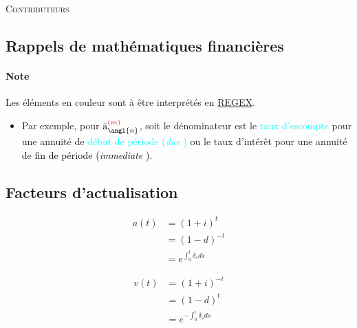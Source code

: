 \documentclass[10pt, french]{article}
\newcommand\cumlaut[2][black]{\stackon[.33ex]{#2}{\textcolor{#1}{\kern-.04ex.\kern-.2ex.}}}
\begin{document}
\begin{center}
	\textsc{\Large Contributeurs}\\[0.5cm] 
\end{center}


\newpage

\raggedcolumns
\footnotesize %
\begin{multicols*}{3} 	%
\section*{Rappels de mathématiques financières}
\paragraph{Note}	Les éléments en couleur sont à être interprétés en \href{https://fr.wikipedia.org/wiki/Expression_régulière}{REGEX}. 
\begin{itemize}
	\item	Par exemple, pour $\cumlaut[cyan]{a}_{\angl{n}}^{\textcolor{red}{(m)}}$, soit le dénominateur est le \textcolor{cyan}{taux d'escompte} pour une annuité de \textcolor{cyan}{début de période (\og \textit{due} \fg{})} ou le taux d'intérêt pour une annuité de \textcolor{black}{fin de période (\og \textit{immediate} \fg{})}.
\end{itemize}

\subsection*{Facteurs d'actualisation}
\begin{minipage}[t]{.5\linewidth}
\begin{align*}
	a(t) 
		&= 	(1 + i)^{t} 		\\
		&= 	(1 - d)^{-t}	\\
		&= 	e^{\int_{0}^{t} \delta_s ds} 
\end{align*}
\end{minipage}
\begin{minipage}[t]{.5\linewidth}
	\begin{align*}
	v(t) 
		&=	(1 + i)^{-t}		\\
		&=	(1 - d)^{t}	 	\\
		&= 	e^{-\int_{0}^{t} \delta_s ds} 
\end{align*}
\end{minipage}



\end{multicols*}
\end{document}
